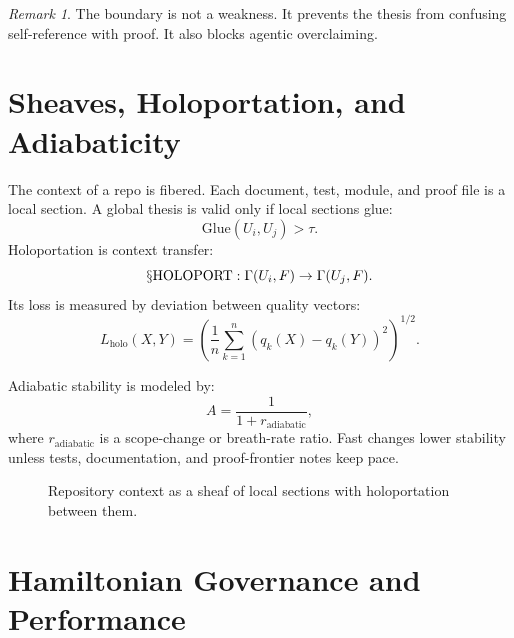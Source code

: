 \documentclass[11pt,oneside]{book}
\theoremstyle{definition}
\theoremstyle{plain}
\theoremstyle{remark}
\newtheorem{remark}[definition]{Remark}
\newcommand{\Sop}[1]{\mathsection\mathrm{#1}}
\begin{document}
\begin{remark}
The boundary is not a weakness.  It prevents the thesis from confusing self-reference
with proof.  It also blocks agentic overclaiming.
\end{remark}

\chapter{Sheaves, Holoportation, and Adiabaticity}

The context of a repo is fibered.  Each document, test, module, and proof file is a local
section.  A global thesis is valid only if local sections glue:
\[
  \mathrm{Glue}(U_i,U_j)>\tau.
\]
Holoportation is context transfer:
\[
  \Sop{HOLOPORT}:\Gamma(U_i,F)\to\Gamma(U_j,F).
\]
Its loss is measured by deviation between quality vectors:
\[
  L_{\mathrm{holo}}(X,Y)
  =
  \left(
  \frac{1}{n}\sum_{k=1}^n(q_k(X)-q_k(Y))^2
  \right)^{1/2}.
\]

Adiabatic stability is modeled by:
\[
  A=\frac{1}{1+r_{\mathrm{adiabatic}}},
\]
where \(r_{\mathrm{adiabatic}}\) is a scope-change or breath-rate ratio.  Fast changes
lower stability unless tests, documentation, and proof-frontier notes keep pace.

\begin{figure}[ht]
\centering
{}
\caption{Repository context as a sheaf of local sections with holoportation between them.}
\end{figure}

\chapter{Hamiltonian Governance and Performance}
\end{document}
